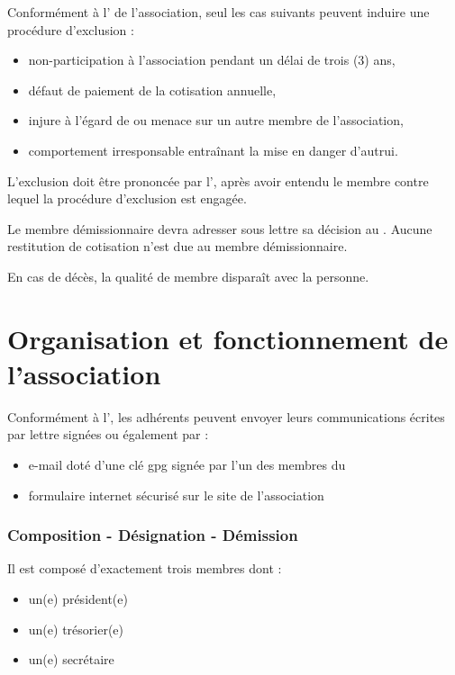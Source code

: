 \label{sec:exclusion}

Conformément à l' de l'association, seul les cas suivants  peuvent induire une procédure d'exclusion :
\begin{itemize}
\item non-participation à l'association pendant un délai de trois (3) ans,
\item défaut de paiement de la cotisation annuelle,
\item injure à l'égard de ou menace sur un autre membre de l'association,
\item comportement irresponsable entraînant la mise en danger d'autrui.
\end{itemize}

L'exclusion doit être prononcée par l'\AG{}, après avoir entendu le membre contre lequel la procédure d'exclusion est engagée.

\label{sec:demiss-deces-disp}
Le membre démissionnaire devra adresser sous lettre sa décision au \bureau{}.
Aucune restitution de cotisation n'est due au membre démissionnaire.

En cas de décès, la qualité de membre disparaît avec la personne.

\section{Organisation et fonctionnement de l'association}

\label{sec:comm-des-adher}

Conformément à l', les adhérents peuvent envoyer leurs communications écrites par lettre signées ou également par :
\begin{itemize}
\item e-mail doté d'une clé gpg signée par l'un des membres du \bureau{}
\item formulaire internet sécurisé sur le site de l'association
\end{itemize}


\label{sec:fonct-du-bure}

\subsubsection*{Composition - Désignation - Démission}
\label{sec:comp-design}
Il est composé d'exactement trois membres dont :
\begin{itemize}
\item un(e) président(e)
\item un(e) trésorier(e)
\item un(e) secrétaire
\end{itemize}

